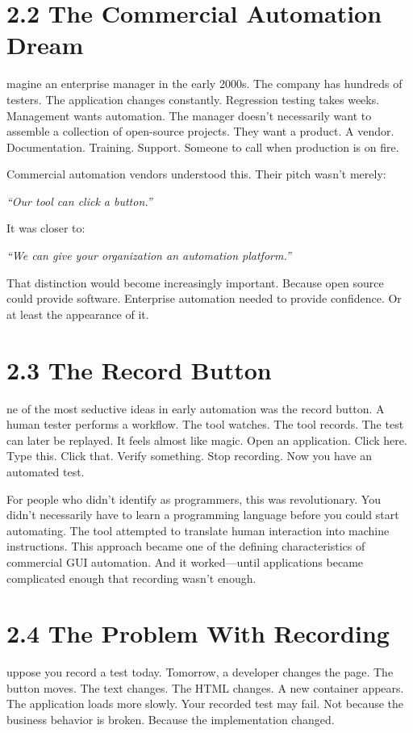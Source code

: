 \documentclass[11pt, a4paper, openany]{book}
\newcommand{\initialcap}[1]{{\fontfamily{lmss}\selectfont\huge\textbf{#1}}}
\begin{document}
\section{2.2 The Commercial Automation Dream}
\noindent \initialcap{I}magine an enterprise manager in the early 2000s. The company has hundreds of testers. The application changes constantly. Regression testing takes weeks. Management wants automation. The manager doesn't necessarily want to assemble a collection of open-source projects. They want a product. A vendor. Documentation. Training. Support. Someone to call when production is on fire.

Commercial automation vendors understood this. Their pitch wasn't merely:
\begin{center}
\textit{``Our tool can click a button.''}
\end{center}
It was closer to:
\begin{center}
\textit{``We can give your organization an automation platform.''}
\end{center}
That distinction would become increasingly important. Because open source could provide software. Enterprise automation needed to provide confidence. Or at least the appearance of it.

\section{2.3 The Record Button}
\noindent \initialcap{O}ne of the most seductive ideas in early automation was the record button. A human tester performs a workflow. The tool watches. The tool records. The test can later be replayed. It feels almost like magic. Open an application. Click here. Type this. Click that. Verify something. Stop recording. Now you have an automated test.

For people who didn't identify as programmers, this was revolutionary. You didn't necessarily have to learn a programming language before you could start automating. The tool attempted to translate human interaction into machine instructions. This approach became one of the defining characteristics of commercial GUI automation. And it worked---until applications became complicated enough that recording wasn't enough.

\section{2.4 The Problem With Recording}
\noindent \initialcap{S}uppose you record a test today. Tomorrow, a developer changes the page. The button moves. The text changes. The HTML changes. A new container appears. The application loads more slowly. Your recorded test may fail. Not because the business behavior is broken. Because the implementation changed.
\end{document}
